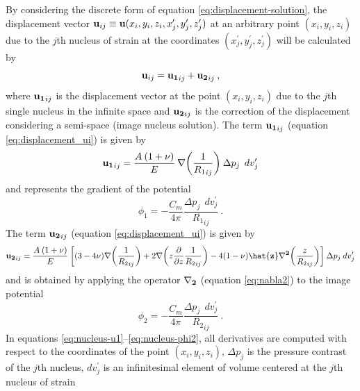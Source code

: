 \documentclass[journal abbreviation, manuscript]{copernicus}
\begin{document}
By considering the discrete form of equation \ref{eq:displacement-solution}, the displacement vector  $ {\bf{u}}_{ij} \equiv  {\bf{u}}(x_{i}, y_{i}, z_{i}, x^{\prime}_{j}, y^{\prime}_{j}, z^{\prime}_{j})$ at an arbitrary point $(x_{i}, y_{i}, z_{i})$ due to the $j$th nucleus of strain at the coordinates 
$(x^{\prime}_{j}, y^{\prime}_{j}, z^{\prime}_{j})$ will be calculated by
\begin{equation}
{\bf{u}}_{ij}  = {\bf{u_{1}}}_{ij} + {\bf{u_{2}}}_{ij} \: ,
\label{eq:displacement_ui}
\end{equation}
where ${\bf{u_{1}}}_{ij}$ is the displacement vector at the point $(x_{i}, y_{i}, z_{i})$ due to the $j$th single nucleus in the infinite space and ${\bf{u_{2}}}_{ij}$ 
is the correction of the displacement considering a semi-space (image nucleus solution).
The term ${\bf{u_{1}}}_{ij}$ (equation \ref{eq:displacement_ui}) is given by
\begin{equation}
{\bf{u_{1}}}_{ij} = \frac{A  \: (1 + \nu)}{E} \: {\bf{\nabla}} \bigg( {\frac{1}{{R_1}_{ij}}} \bigg) 
\: \Delta p_{j} \: \:dv_j^{\prime}
\label{eq:nucleus-u1}
\end{equation}
and represents the gradient of the potential
\begin{equation}
\phi_{1} = - \frac{C_m}{4 \pi}  \frac{\Delta p_{j} \: \:dv_j^{\prime}}{ {R_1}_{ij} } \: .
\label{eq:nucleus-phi1}
\end{equation}
The term ${\bf{u_{2}}}_{ij}$ (equation \ref{eq:displacement_ui}) is given by
\begin{equation}
{\bf{u_{2}}}_{ij} = \frac{A  \: (1 + \nu)}{E} \: 
\bigg[ 
(3 - 4\nu){\bf{\nabla}} \bigg(  {\frac{1}{{R_2}_{ij}}} \bigg)     
+ 2 {\bf{\nabla}} \bigg( z \frac{\partial }{\partial z} {\frac{1}{{R_2}_{ij}}} \bigg)  
- 4(1- \nu){\bf{\hat{z}}} {\bf{{\nabla}^{2}}}  \bigg( {\frac{z}{{R_2}_{ij}}} \bigg)
\bigg]   \: \Delta p_{j}  \:dv_j^{\prime}
\label{eq:nucleus-u2}
\end{equation}
and is obtained by applying the operator ${\bf{{\nabla}_{2}}}$ (equation 
\ref{eq:nabla2}) to the image potential
\begin{equation}
\phi_{2} = - \frac{C_m}{4 \pi}  \frac{\Delta p_{j} \: \:dv_j^{\prime}}{ {R_2}_{ij} } \: .
\label{eq:nucleus-phi2}
\end{equation}
In equations \ref{eq:nucleus-u1}--\ref{eq:nucleus-phi2}, 
all derivatives are computed with respect to the coordinates of the point 
$(x_{i}, y_{i}, z_{i})$, 
$\Delta p_j$  is the pressure contrast of the $j$th nucleus, $dv_j^{\prime}$ is an 
infinitesimal element of volume centered at the $j$th nucleus of strain 
\end{document}

